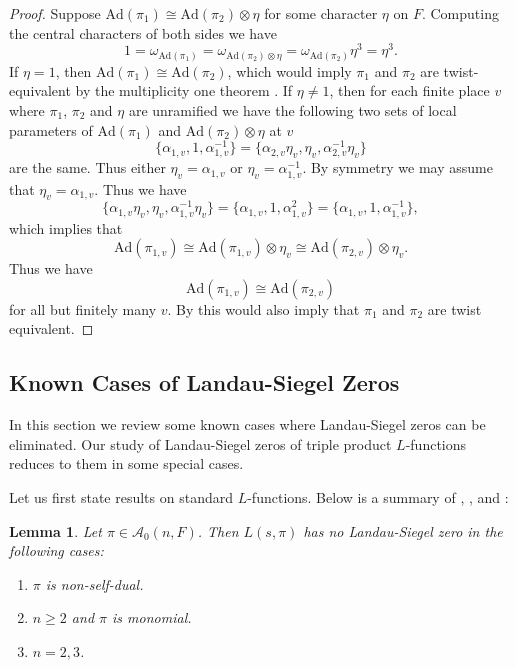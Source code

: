 \documentclass[12pt]{amsart}
\newcommand{\Ad}{\text{Ad}}
\newcommand{\cA}{\mathcal{A}}
\newtheorem{lemma}{Lemma}[section]
\begin{document}
 \begin{proof}
        Suppose $\Ad(\pi_1) \cong \Ad(\pi_2) \otimes \eta$ for some character $\eta$ on $F$. Computing the central characters of both sides we have 
        $$1 = \omega_{\Ad(\pi_1)} = \omega_{\Ad(\pi_2) \otimes \eta} = \omega_{\Ad(\pi_2)} \eta^3 = \eta^3.$$
        If $\eta = 1$, then $\Ad(\pi_1) \cong \Ad(\pi_2)$, which would imply $\pi_1$ and $\pi_2$ are twist-equivalent by the multiplicity one theorem \cite[Theorem 4.1.2]{Ramakrishnan2000}. If $\eta \neq 1$, then for each finite place $v$ where $\pi_1$, $\pi_2$ and $\eta$ are unramified we have the following two sets of local parameters of $\Ad(\pi_1)$ and $\Ad(\pi_2) \otimes \eta$ at $v$
        $$\{\alpha_{1,v},1,\alpha_{1,v}^{-1}\} = \{\alpha_{2,v}\eta_v,\eta_v,\alpha_{2,v}^{-1}\eta_v\}$$
        are the same. Thus either $\eta_v = \alpha_{1,v}$ or $\eta_v = \alpha_{1,v}^{-1}$. By symmetry we may assume that $\eta_v = \alpha_{1,v}$. Thus we have 
        $$\{\alpha_{1,v}\eta_v,\eta_v,\alpha_{1,v}^{-1}\eta_v\} = \{\alpha_{1,v},1,\alpha_{1,v}^2\} = \{\alpha_{1,v},1,\alpha_{1,v}^{-1}\},$$
        which implies that 
        $$\Ad(\pi_{1,v}) \cong \Ad(\pi_{1,v}) \otimes \eta_v \cong \Ad(\pi_{2,v}) \otimes \eta_v.$$
        Thus we have 
        $$\Ad(\pi_{1,v}) \cong \Ad(\pi_{2,v})$$
        for all but finitely many $v$. By \cite[Theorem 4.1.2]{Ramakrishnan2000} this would also imply that $\pi_1$ and $\pi_2$ are twist equivalent.
\end{proof}

\subsection{Known Cases of Landau-Siegel Zeros}\label{Landau-Siegel zero known cases}
In this section we review some known cases where Landau-Siegel zeros can be eliminated. Our study of Landau-Siegel zeros of triple product $L$-functions reduces to them in some special cases. 

Let us first state results on standard $L$-functions. Below is a summary of \cite[Corollary 3.2]{HoffsteinRamakrishnan1995}, \cite[Theorem 3]{Luo2023}, \cite[Theorem C]{HoffsteinRamakrishnan1995} and \cite[Theorem 1]{Banks1997}:

\begin{lemma}\label{standard L-function Landau-Siegel zero}
    Let $\pi \in \cA_0(n,F)$. Then $L(s,\pi)$ has no Landau-Siegel zero in the following cases:
    \begin{enumerate}
        \item $\pi$ is non-self-dual.
        \item $n \geq 2$ and $\pi$ is monomial. 
        \item $n=2,3$.
    \end{enumerate}
\end{lemma}
\end{document}
